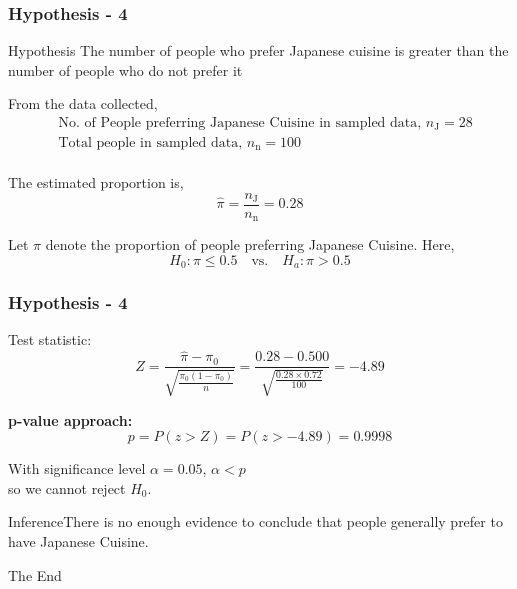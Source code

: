 \documentclass{beamer}
\begin{document}
\begin{frame}
    \frametitle{Hypothesis - 4}
    \begin{block}{Hypothesis}
        The number of people who prefer Japanese cuisine is greater than the number of people who do not prefer it
    \end{block}
    From the data collected, 
    \begin{align}
        &\text{No. of People preferring Japanese Cuisine in sampled data, } n_{\text{J}} = 28 \\
        &\text{Total people in sampled data, } n_{\text{n}} = 100 \\
    \end{align}
    
    The estimated proportion is,
    \begin{equation}
        \hat{\pi} = \frac{n_{\text{J}}}{n_{\text{n}}} = 0.28
    \end{equation}
    
    Let $\pi$ denote the proportion of people preferring Japanese Cuisine. Here,
    \begin{equation}
        H_0: \pi \leq 0.5 \quad \text{vs.} \quad H_a: \pi > 0.5
    \end{equation}
\end{frame}
\begin{frame}
    \frametitle{Hypothesis - 4}
    Test statistic:
    \begin{equation}
        Z = \frac{\hat{\pi} - \pi_0}{\sqrt{\frac{\pi_0(1-\pi_0)}{n}}} = \frac{0.28 - 0.500}{\sqrt{\frac{0.28 \times 0.72}{100}}} = -4.89
    \end{equation}
    
    \textbf{p-value approach:}
    \begin{equation}
        p = P(z > Z) = P(z > -4.89) = 0.9998
    \end{equation}

    With significance level   \( \alpha = 0.05 \), \( \alpha < p \) 
    \\ so we cannot reject \( H_0 \).

\begin{block}{Inference}There is no enough evidence to conclude that people generally prefer to have Japanese Cuisine.
\end{block}
    
\end{frame}







\begin{frame}[plain] %
	\begin{center}
		{\Huge The End}
		
		\bigskip\bigskip %
		
	\end{center}
\end{frame}
\end{document}
